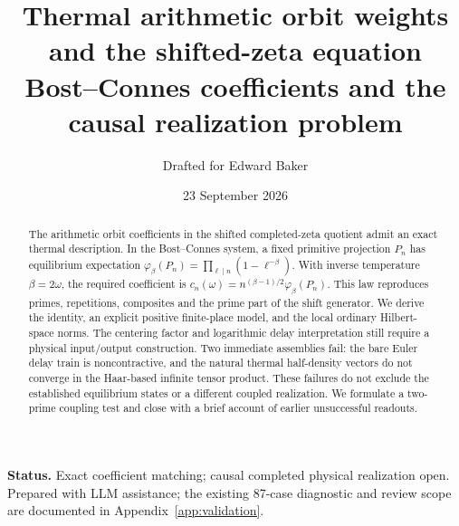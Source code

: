 \documentclass[11pt]{article}
\title{Thermal arithmetic orbit weights\\and the shifted-zeta equation\\[4pt]
\large Bost--Connes coefficients and the causal realization problem}
\author{Drafted for Edward Baker}
\date{23 September 2026}
\begin{document}
\maketitle
\begin{abstract}
The arithmetic orbit coefficients in the shifted completed-zeta quotient
admit an exact thermal description. In the Bost--Connes system, a fixed
primitive projection $P_n$ has equilibrium expectation
$\varphi_\beta(P_n)=\prod_{\ell\mid n}(1-\ell^{-\beta})$.
With inverse temperature $\beta=2\omega$, the required coefficient is
$c_n(\omega)=n^{(\beta-1)/2}\varphi_\beta(P_n)$.
This law reproduces primes, repetitions, composites and the prime part of
the shift generator. We derive the identity, an explicit positive
finite-place model, and the local ordinary Hilbert-space norms.
The centering factor and logarithmic delay interpretation still require
a physical input/output construction. Two immediate assemblies fail:
the bare Euler delay train is noncontractive, and the natural thermal
half-density vectors do not converge in the Haar-based infinite tensor
product. These failures do not exclude the established equilibrium states
or a different coupled realization. We formulate a two-prime coupling
test and close with a brief account of earlier unsuccessful readouts.
\end{abstract}
\noindent\textbf{Status.} Exact coefficient matching; causal completed
physical realization open. Prepared with LLM assistance; the existing
87-case diagnostic and review scope are documented in
Appendix~\ref{app:validation}.
{\small\tableofcontents}
\clearpage






\appendix

\clearpage

\end{document}
